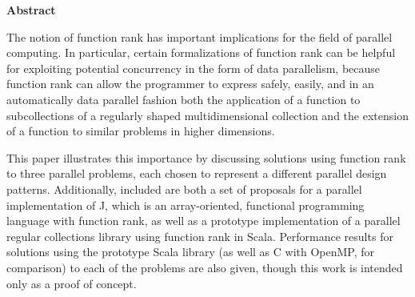 \begin{center}

\bigskip

\begin{Large}
\textbf{\theTitle}
\end{Large}

\bigskip

\begin{large}
\theAuthor
\end{large}

\bigskip
\bigskip

\textbf{Abstract}

\end{center}

\noindent
The notion of function rank has important implications for the field of parallel computing.
In particular, certain formalizations of function rank can be helpful 
for exploiting potential concurrency in the form of data parallelism, 
because function rank can allow the programmer to express safely, easily, and in an automatically data parallel fashion  
both the application of a function to subcollections of a regularly shaped multidimensional collection and 
the extension of a function to similar problems in higher dimensions.

This paper illustrates this importance 
by discussing solutions using function rank to three parallel problems, 
each chosen to represent a different parallel design patterns. 
Additionally, included are both a set of proposals for a parallel implementation of J, 
which is an array-oriented, functional programming language with function rank, 
as well as a prototype implementation of a parallel regular collections library using function rank in Scala. 
Performance results for solutions using the prototype Scala library (as well as C with OpenMP, for comparison) 
to each of the problems are also given, though this work is intended only as a proof of concept.
